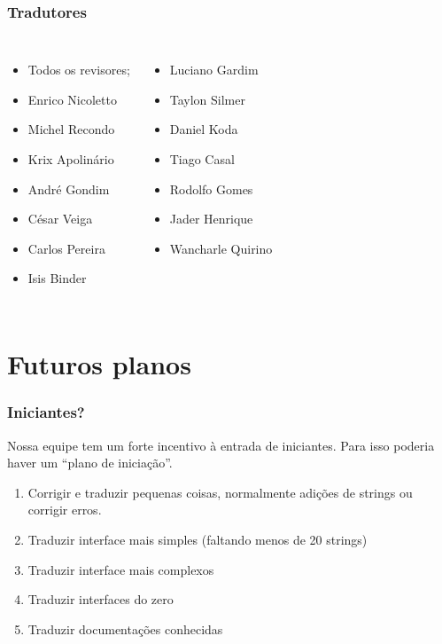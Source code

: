 \documentclass{beamer}
\begin{document}
\begin{frame}[fragile]
    \frametitle{Tradutores}
    \begin{columns}[c]
      \column{1.5in}

      \begin{itemize}
        \item Todos os revisores;
        \item Enrico Nicoletto
        \item Michel Recondo
        \item Krix Apolinário
        \item André Gondim
        \item César Veiga
        \item Carlos Pereira
        \item Isis Binder
      \end{itemize}

      \column{1.5in}
      \begin{itemize}
        \item Luciano Gardim
        \item Taylon Silmer
        \item Daniel Koda
        \item Tiago Casal
        \item Rodolfo Gomes
        \item Jader Henrique 
        \item Wancharle Quirino 
      \end{itemize}
    \end{columns}

\end{frame}

\section{Futuros planos}

\begin{frame}
    \frametitle{Iniciantes?}
    Nossa equipe tem um forte incentivo à entrada de iniciantes. Para isso poderia haver um ``plano de iniciação''.
    \begin{enumerate}
        \item Corrigir e traduzir pequenas coisas, normalmente adições de strings ou corrigir erros. 
        \item Traduzir interface mais simples (faltando menos de 20 strings)
        \item Traduzir interface mais complexos 
        \item Traduzir interfaces do zero
        \item Traduzir documentações conhecidas
    \end{enumerate}
\end{frame}
\end{document}
